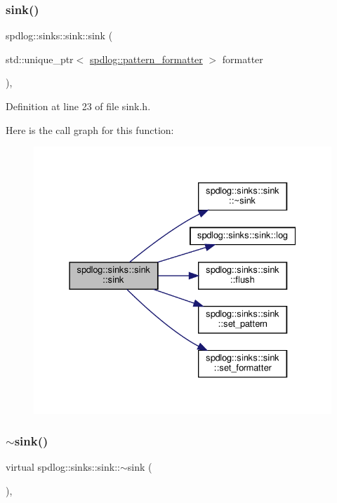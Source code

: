 \subsubsection{\texorpdfstring{sink()}{sink()}\hspace{0.1cm}{\footnotesize\ttfamily [2/2]}}
{\footnotesize\ttfamily spdlog\+::sinks\+::sink\+::sink (\begin{DoxyParamCaption}\item[{std\+::unique\+\_\+ptr$<$ \hyperlink{classspdlog_1_1pattern__formatter}{spdlog\+::pattern\+\_\+formatter} $>$}]{formatter }\end{DoxyParamCaption})\hspace{0.3cm}{\ttfamily [inline]}, {\ttfamily [explicit]}}



Definition at line 23 of file sink.\+h.

Here is the call graph for this function\+:
\nopagebreak
\begin{figure}[H]
\begin{center}
\leavevmode
\includegraphics[width=331pt]{classspdlog_1_1sinks_1_1sink_a8523cd526092feffd549cf7a8b5f38fe_cgraph}
\end{center}
\end{figure}
\mbox{\label{classspdlog_1_1sinks_1_1sink_a2637af0973ac863eedd76ee683279c0b}} 
\subsubsection{\texorpdfstring{$\sim$sink()}{~sink()}}
{\footnotesize\ttfamily virtual spdlog\+::sinks\+::sink\+::$\sim$sink (\begin{DoxyParamCaption}{ }\end{DoxyParamCaption})\hspace{0.3cm}{\ttfamily [virtual]}, {\ttfamily [default]}}

